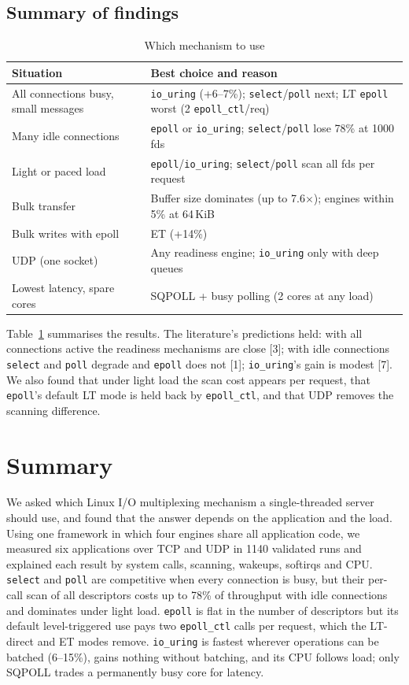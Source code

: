 \documentclass[conference,10pt]{IEEEtran}
\newcommand{\code}[1]{\texttt{#1}}
\begin{document}
\subsection{Summary of findings}
\begin{table}[t]
\caption{Which mechanism to use}
\label{tab:summary}
\centering\small
\begin{tabularx}{\columnwidth}{@{}>{\raggedright\arraybackslash}p{27mm}X@{}}
\toprule
Situation & Best choice and reason\\
\midrule
All connections busy, small messages & \code{io\_uring} (+6--7\%); \code{select}/\code{poll} next; LT \code{epoll} worst (2 \code{epoll\_ctl}/req)\\
Many idle connections & \code{epoll} or \code{io\_uring}; \code{select}/\code{poll} lose 78\% at 1000 fds\\
Light or paced load & \code{epoll}/\code{io\_uring}; \code{select}/\code{poll} scan all fds per request\\
Bulk transfer & Buffer size dominates (up to 7.6$\times$); engines within 5\% at 64\,KiB\\
Bulk writes with epoll & ET (+14\%)\\
UDP (one socket) & Any readiness engine; \code{io\_uring} only with deep queues\\
Lowest latency, spare cores & SQPOLL + busy polling (2 cores at any load)\\
\bottomrule
\end{tabularx}
\end{table}

Table~\ref{tab:summary} summarises the results. The literature's predictions held: with all connections active the readiness mechanisms are close [3]; with idle connections \code{select} and \code{poll} degrade and \code{epoll} does not [1]; \code{io\_uring}'s gain is modest [7]. We also found that under light load the scan cost appears per request, that \code{epoll}'s default LT mode is held back by \code{epoll\_ctl}, and that UDP removes the scanning difference.

\section{Summary}
We asked which Linux I/O multiplexing mechanism a single-threaded server should use, and found that the answer depends on the application and the load. Using one framework in which four engines share all application code, we measured six applications over TCP and UDP in 1140 validated runs and explained each result by system calls, scanning, wakeups, softirqs and CPU. \code{select} and \code{poll} are competitive when every connection is busy, but their per-call scan of all descriptors costs up to 78\% of throughput with idle connections and dominates under light load. \code{epoll} is flat in the number of descriptors but its default level-triggered use pays two \code{epoll\_ctl} calls per request, which the LT-direct and ET modes remove. \code{io\_uring} is fastest wherever operations can be batched (6--15\%), gains nothing without batching, and its CPU follows load; only SQPOLL trades a permanently busy core for latency.
\end{document}
